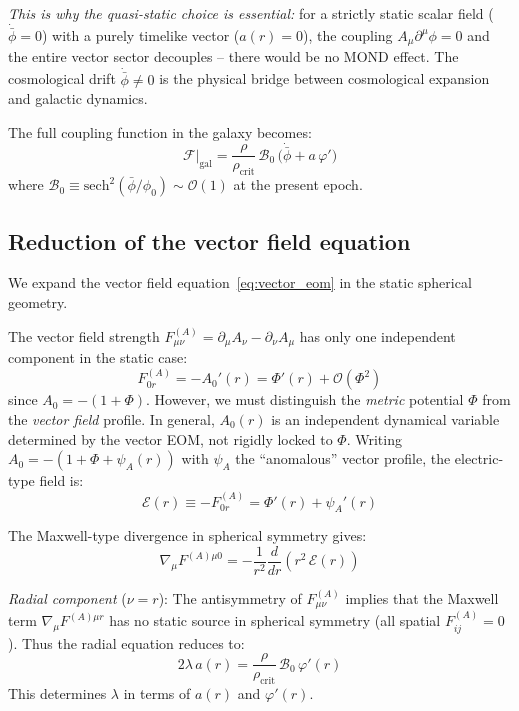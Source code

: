 \documentclass[aps,prd,twocolumn,superscriptaddress,nofootinbib]{revtex4-2}
\begin{document}
\textit{This is why the quasi-static choice is essential:} for a strictly static scalar field ($\dot{\bar{\phi}} = 0$) with a purely timelike vector ($a(r) = 0$), the coupling $A_\mu\partial^\mu\phi = 0$ and the entire vector sector decouples -- there would be no MOND effect. The cosmological drift $\dot{\bar{\phi}} \neq 0$ is the physical bridge between cosmological expansion and galactic dynamics.

The full coupling function in the galaxy becomes:
\begin{equation}
\mathcal{F}\big|_{\mathrm{gal}} = \frac{\rho}{\rho_{\mathrm{crit}}}\,\mathcal{B}_0\,\bigl(\dot{\bar{\phi}} + a\,\varphi'\bigr)
\label{eq:F_galaxy}
\end{equation}
where $\mathcal{B}_0 \equiv \mathrm{sech}^2(\bar{\phi}/\phi_0) \sim \mathcal{O}(1)$ at the present epoch.

\subsection{Reduction of the vector field equation}
\label{sec:vector_reduction}

We expand the vector field equation~\eqref{eq:vector_eom} in the static spherical geometry.

The vector field strength $F^{(A)}_{\mu\nu} = \partial_\mu A_\nu - \partial_\nu A_\mu$ has only one independent component in the static case:
\begin{equation}
F^{(A)}_{0r} = -A_0'(r) = \Phi'(r) + \mathcal{O}(\Phi^2)
\label{eq:F0r}
\end{equation}
since $A_0 = -(1+\Phi)$. However, we must distinguish the \textit{metric} potential $\Phi$ from the \textit{vector field} profile. In general, $A_0(r)$ is an independent dynamical variable determined by the vector EOM, not rigidly locked to $\Phi$. Writing $A_0 = -(1 + \Phi + \psi_A(r))$ with $\psi_A$ the ``anomalous'' vector profile, the electric-type field is:
\begin{equation}
\mathcal{E}(r) \equiv -F^{(A)}_{0r} = \Phi'(r) + \psi_A'(r)
\label{eq:E_field}
\end{equation}

The Maxwell-type divergence in spherical symmetry gives:
\begin{equation}
\nabla_\mu F^{(A)\mu 0} = -\frac{1}{r^2}\frac{d}{dr}\!\left(r^2\,\mathcal{E}(r)\right)
\label{eq:divE}
\end{equation}

\textit{Radial component} ($\nu = r$): The antisymmetry of $F^{(A)}_{\mu\nu}$ implies that the Maxwell term $\nabla_\mu F^{(A)\mu r}$ has no static source in spherical symmetry (all spatial $F^{(A)}_{ij} = 0$). Thus the radial equation reduces to:
\begin{equation}
2\lambda\,a(r) = \frac{\rho}{\rho_{\mathrm{crit}}}\,\mathcal{B}_0\,\varphi'(r)
\label{eq:radial_vec}
\end{equation}
This determines $\lambda$ in terms of $a(r)$ and $\varphi'(r)$.
\end{document}
